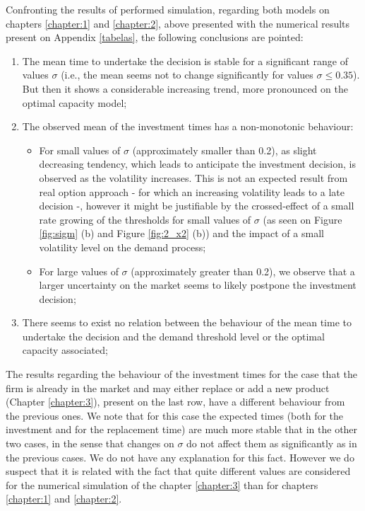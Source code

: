 Confronting the results of performed simulation, regarding both models on chapters \ref{chapter:1} and \ref{chapter:2}, above presented with the numerical results present on Appendix \ref{tabelas}, the following conclusions are pointed:
\begin{enumerate}
	
	
	
	\item The mean time to undertake the decision is stable for a significant range of values $\sigma$ (i.e., the mean seems not to change significantly for values $\sigma \leq 0.35$). But then it shows a considerable increasing trend, more pronounced on the optimal capacity model;
	
	\item  The observed mean of the investment times has a non-monotonic behaviour:
	 \begin{itemize}
	 	\item For small values of $\sigma$ (approximately smaller than 0.2),  as slight decreasing tendency, which leads to anticipate the investment decision, is observed as the volatility increases. This is not an expected result from real option approach - for which an increasing volatility leads to a late decision \cite{dixit:book} -, however it might be justifiable by the crossed-effect of a small rate growing of the thresholds for small values of $\sigma$ (as seen on Figure \ref{fig:sigm} (b) and Figure \ref{fig:2_x2} (b)) and the impact of a small volatility level on the demand process; 
	 	\item For large values of $\sigma$ (approximately greater than 0.2), we observe that a larger uncertainty on the market seems to likely postpone the investment decision;
	 \end{itemize}

	\item There seems to exist no relation between the behaviour of the mean time to undertake the decision and the demand threshold level or the optimal capacity associated;	
	
\end{enumerate}



The results regarding the behaviour of the investment times for the case that the firm is already in the market and may either replace or add a new product (Chapter \ref{chapter:3}), present on the last row, have a different behaviour from the previous ones. We note that for this case the expected times (both for the investment and for the replacement time) are much more stable that in the other two cases, in the sense that changes on $\sigma$ do not affect them as significantly as in the previous cases. We do not have any explanation for this fact. However we do suspect that it is related with the fact that quite different values are considered for the numerical simulation of the chapter \ref{chapter:3} than for chapters \ref{chapter:1} and \ref{chapter:2}.  





